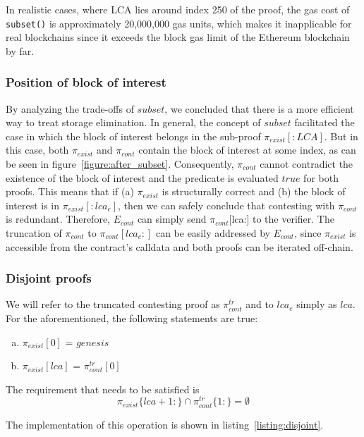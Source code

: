 In realistic cases, where LCA lies around index 250 of the proof, the gas cost
of \texttt{subset()} is approximately 20,000,000 gas units, which makes it
inapplicable for real blockchains since it exceeds the block gas limit of the
Ethereum blockchain by far.

\subsubsection{Position of block of interest}

By analyzing the trade-offs of $subset$, we concluded that there is a more
efficient way to treat storage elimination. In general, the concept of $subset$
facilitated the case in which the block of interest belongs in the sub-proof
$\pi_{exist}[:LCA]$. But in this case, both $\pi_{exist}$ and $\pi_{cont}$
contain the block of interest at some index, as can be seen in
figure~\ref{figure:after_subset}. Consequently, $\pi_{cont}$ cannot contradict
the existence of the block of interest and the predicate is evaluated $true$
for both proofs. This means that if (a) $\pi_{exist}$ is structurally correct
and (b) the block of interest is in $\pi_{exist}[:lca_{e}]$, then we can safely
conclude that contesting with $\pi_{cont}$ is redundant. Therefore,
$E_{cont}$ can simply send $\pi_{cont}$[lca:] to the verifier. The
truncation of $\pi_{cont}$ to $\pi_{cont}[lca_{c}:]$ can be easily addressed
by $E_{cont}$, since $\pi_{exist}$ is accessible from the contract's calldata
and both proofs can be iterated off-chain.

\subsubsection{Disjoint proofs}

We will refer to the truncated contesting proof as $\pi_{cont}^{tr}$ and to
$lca_{e}$ simply as $lca$. For the aforementioned, the following statements are
true:

\begin{enumerate}[(a)]
    \item  $\pi_{exist}[0]$ = $genesis$
    \item  $\pi_{exist}[lca]$ = $\pi_{cont}^{tr}[0]$
\end{enumerate}

The requirement that needs to be satisfied is
\[\pi_{exist}\{lca+1:\} \cap \pi_{cont}^{tr}\{1:\} = \emptyset \]

The implementation of this operation is shown in
listing~\ref{listing:disjoint}.

